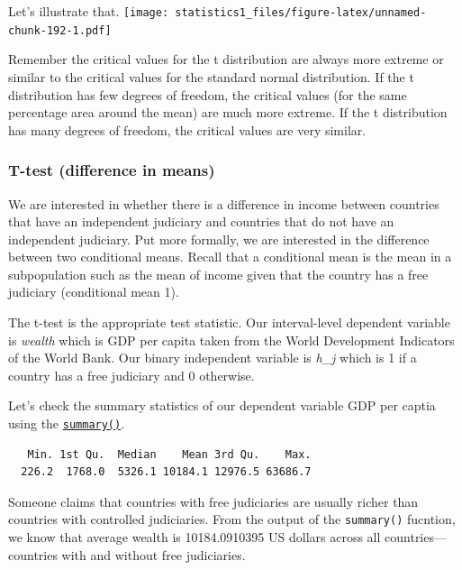 \documentclass[]{article}
\newenvironment{Shaded}{\begin{snugshade}}{\end{snugshade}}
\newcommand{\KeywordTok}[1]{\textcolor[rgb]{0.13,0.29,0.53}{\textbf{#1}}}
\newcommand{\OperatorTok}[1]{\textcolor[rgb]{0.81,0.36,0.00}{\textbf{#1}}}
\newcommand{\NormalTok}[1]{#1}
\theoremstyle{definition}
\theoremstyle{definition}
\theoremstyle{definition}
\theoremstyle{remark}
\begin{document}
Let's illustrate that.
\texttt{[image: statistics1\_files/figure-latex/unnamed-chunk-192-1.pdf]}

Remember the critical values for the t distribution are always more
extreme or similar to the critical values for the standard normal
distribution. If the t distribution has few degrees of freedom, the
critical values (for the same percentage area around the mean) are much
more extreme. If the t distribution has many degrees of freedom, the
critical values are very similar.

\subsubsection{T-test (difference in
means)}\label{t-test-difference-in-means}

We are interested in whether there is a difference in income between
countries that have an independent judiciary and countries that do not
have an independent judiciary. Put more formally, we are interested in
the difference between two conditional means. Recall that a conditional
mean is the mean in a subpopulation such as the mean of income given
that the country has a free judiciary (conditional mean 1).

The t-test is the appropriate test statistic. Our interval-level
dependent variable is \emph{wealth} which is GDP per capita taken from
the World Development Indicators of the World Bank. Our binary
independent variable is \emph{h\_j} which is 1 if a country has a free
judiciary and 0 otherwise.

Let's check the summary statistics of our dependent variable GDP per
captia using the
\href{https://www.rdocumentation.org/packages/base/versions/3.4.1/topics/summary}{\texttt{summary()}}.

\begin{Shaded}
\end{Shaded}

\begin{verbatim}
   Min. 1st Qu.  Median    Mean 3rd Qu.    Max. 
  226.2  1768.0  5326.1 10184.1 12976.5 63686.7 
\end{verbatim}

Someone claims that countries with free judiciaries are usually richer
than countries with controlled judiciaries. From the output of the
\texttt{summary()} fucntion, we know that average wealth is
10184.0910395 US dollars across all countries---countries with and
without free judiciaries.
\end{document}
